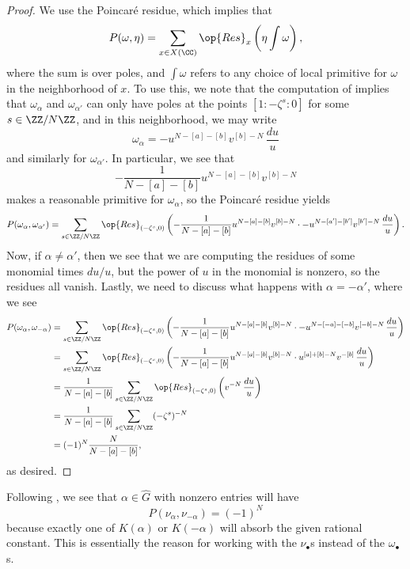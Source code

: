 \documentclass[../thesis.tex]{subfiles}
\begin{document}
\begin{proof}
	We use the Poincar\'e residue, which implies that
	\[P(\omega,\eta)=\sum_{x\in X(\CC)}\op{Res}_x\left(\eta\int\omega\right),\]
	where the sum is over poles, and $\int\omega$ refers to any choice of local primitive for $\omega$ in the neighborhood of $x$. To use this, we note that the computation of  implies that $\omega_{\alpha}$ and $\omega_{\alpha'}$ can only have poles at the points $[1:-\zeta^s:0]$ for some $s\in\ZZ/N\ZZ$, and in this neighborhood, we may write
	\[\omega_\alpha=-u^{N-[a]-[b]}v^{[b]-N}\,\frac{du}u\]
	and similarly for $\omega_{\alpha'}$. In particular, we see that
	\[-\frac1{N-[a]-[b]}u^{N-[a]-[b]}v^{[b]-N}\]
	makes a reasonable primitive for $\omega_\alpha$, so the Poincar\'e residue yields
	\[P(\omega_\alpha,\omega_{\alpha'}) = \sum_{s\in\ZZ/N\ZZ}\op{Res}_{(-\zeta^s,0)}\left(-\frac1{N-[a]-[b]}u^{N-[a]-[b]}v^{[b]-N}\cdot-u^{N-[a']-[b']}v^{[b']-N}\,\frac{du}u\right).\]
	Now, if $\alpha\ne\alpha'$, then we see that we are computing the residues of some monomial times $du/u$, but the power of $u$ in the monomial is nonzero, so the residues all vanish. Lastly, we need to discuss what happens with $\alpha=-\alpha'$, where we see
	\begin{align*}
		P(\omega_\alpha,\omega_{-\alpha}) &= \sum_{s\in\ZZ/N\ZZ}\op{Res}_{(-\zeta^s,0)}\left(-\frac1{N-[a]-[b]}u^{N-[a]-[b]}v^{[b]-N}\cdot-u^{N-[-a]-[-b]}v^{[-b]-N}\,\frac{du}u\right) \\
		&= \sum_{s\in\ZZ/N\ZZ}\op{Res}_{(-\zeta^s,0)}\left(-\frac1{N-[a]-[b]}u^{N-[a]-[b]}v^{[b]-N}\cdot u^{[a]+[b]-N}v^{-[b]}\,\frac{du}u\right) \\
		&= \frac1{N-[a]-[b]}\sum_{s\in\ZZ/N\ZZ}\op{Res}_{(-\zeta^s,0)}\left(v^{-N}\,\frac{du}u\right) \\
		&= \frac1{N-[a]-[b]}\sum_{s\in\ZZ/N\ZZ}(-\zeta^s)^{-N} \\
		&= (-1)^N\frac N{N-[a]-[b]},
	\end{align*}
	as desired.
\end{proof}
\begin{remark} \label{rem:coleman-differentials-dual}
	Following , we see that $\alpha\in\widehat G$ with nonzero entries will have
	\[P(\nu_\alpha,\nu_{-\alpha})=(-1)^N\]
	because exactly one of $K(\alpha)$ or $K(-\alpha)$ will absorb the given rational constant. This is essentially the reason for working with the $\nu_\bullet$s instead of the $\omega_\bullet$s. 
\end{remark}
\end{document}
